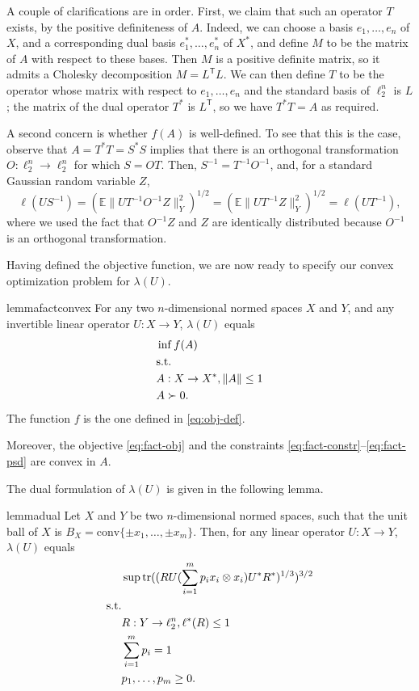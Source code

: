 \documentclass[11pt]{article}
\newcommand{\E}{\mathbb{E}}
\newcommand{\T}{\mathsf T}
\DeclareMathOperator{\tr}{tr}
\begin{document}
A couple of clarifications are in order. First, we claim that such an
operator $T$ exists, by the positive definiteness of $A$. Indeed, we
can choose a basis $e_1, \ldots, e_n$ of $X$, and a corresponding dual
basis $e_1^*, \ldots, e_n^*$ of $X^*$, and define $M$ to be the matrix
of $A$ with respect to these bases. Then $M$ is a positive definite
matrix, so it admits a Cholesky decomposition $M = L^\T L$. We can
then define $T$ to be the operator whose matrix with respect to $e_1,
\ldots, e_n$ and the standard basis of $\ell_2^n$ is $L$; the matrix
of the dual operator $T^*$ is $L^\T$, so we have $T^*T = A$ as required.

A second concern is whether $f(A)$ is well-defined. To see that this
is the case, observe that $A = T^*T = S^*S$ implies that there is an
orthogonal transformation $O:\ell_2^n \to \ell_2^n$ for which $S =
OT$.  Then, $S^{-1} = T^{-1}O^{-1}$, and, for a standard Gaussian
random variable $Z$,
\[
\ell(US^{-1}) = (\E\|UT^{-1}O^{-1}Z\|_Y^2)^{1/2} =
(\E\|UT^{-1}Z\|_Y^2)^{1/2}
= \ell(UT^{-1}),
\]
where we used the fact that $O^{-1}Z$ and $Z$ are identically
distributed because $O^{-1}$ is an orthogonal transformation. 

Having defined the objective function, we are now ready to specify our
convex optimization problem for $\lambda(U)$.
\begin{restatable}{lemma}{factconvex}
  \label{lm:fact-convex}
  For any two $n$-dimensional normed spaces $X$ and $Y$, and any
  invertible linear operator $U:X \to Y$, $\lambda(U)$ equals
  \begin{align}
    &\inf  f(A)  \label{eq:fact-obj}\\
    &\text{s.t.}\notag\\
    &A: X \to X^*,\|A\| \le 1\label{eq:fact-constr}\\
    &A \succ 0.\label{eq:fact-psd}
  \end{align}
  The function $f$ is the one defined in \eqref{eq:obj-def}.

  Moreover, the objective \eqref{eq:fact-obj} and the constraints
  \eqref{eq:fact-constr}--\eqref{eq:fact-psd} are convex in $A$.
\end{restatable}

The dual formulation of $\lambda(U)$ is given in the following lemma. 
\begin{restatable}{lemma}{dual}
  \label{lm:dual}
  Let $X$ and $Y$ be two $n$-dimensional normed spaces, such that the
  unit ball of $X$ is $B_X = \mathrm{conv}\{\pm x_1, \ldots, \pm
  x_m\}$. Then, for any linear operator $U:X \to Y$, $\lambda(U)$
  equals
  \begin{align}
    &\sup \tr((RU(\sum_{i = 1}^m{p_i x_i \otimes  x_i})U^*R^*)^{1/3})^{3/2}\label{eq:dual-obj}\\
    \text{s.t.}\notag\\
    &R: Y \to \ell_2^n, \ell^*(R) \le 1 \label{eq:dual-ellstar}\\
    &\sum_{i = 1}^m{p_i} = 1\label{eq:dual-prob}\\
    &p_1, \ldots, p_m \ge 0. \label{eq:dual-nonneg}
  \end{align}
\end{restatable}
\end{document}
